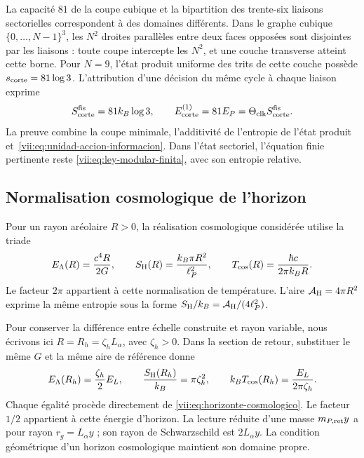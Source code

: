 La capacité \(81\) de la coupe cubique et la bipartition des trente-six liaisons sectorielles correspondent à des domaines différents. Dans le graphe cubique \(\{0,\ldots,N-1\}^3\), les \(N^2\) droites parallèles entre deux faces opposées sont disjointes par les liaisons : toute coupe intercepte les \(N^2\), et une couche transverse atteint cette borne. Pour \(N=9\), l'état produit uniforme des trits de cette couche possède \(s_{\rm corte}=81\log3\). L'attribution d'une décision du même cycle à chaque liaison exprime
\begin{equation}
 S_{\rm corte}^{\rm fis}=81k_B\log3,\qquad
 E_{\rm corte}^{(1)}=81E_P
                  =\Theta_{\rm clk}S_{\rm corte}^{\rm fis}.
 \label{vii:eq:corte-energia-informacion}
\end{equation}
La preuve combine la coupe minimale, l'additivité de l'entropie de l'état produit et~\eqref{vii:eq:unidad-accion-informacion}. Dans l'état sectoriel, l'équation finie pertinente reste \eqref{vii:eq:ley-modular-finita}, avec son entropie relative.

\subsection{Normalisation cosmologique de l'horizon}
\label{vii:subsec:balance-horizonte}

Pour un rayon aréolaire \(R>0\), la réalisation cosmologique considérée utilise la triade
\begin{equation}
 E_\Lambda(R)=\frac{c^4R}{2G},\qquad
 S_{\rm H}(R)=\frac{k_B\pi R^2}{\ell_P^2},\qquad
 T_{\rm cos}(R)=\frac{\hbar c}{2\pi k_BR}.
 \label{vii:eq:horizonte-cosmologico}
\end{equation}
Le facteur \(2\pi\) appartient à cette normalisation de température.
L'aire \(\mathcal A_{\rm H}=4\pi R^2\) exprime la même entropie
sous la forme \(S_{\rm H}/k_B=\mathcal A_{\rm H}/(4\ell_P^2)\).

Pour conserver la différence entre échelle construite et rayon variable, nous écrivons ici \(R=R_h=\zeta_hL_\alpha\), avec \(\zeta_h>0\). Dans la section de retour, substituer le même \(G\) et la même aire de référence donne
\[
 E_\Lambda(R_h)=\frac{\zeta_h}{2}E_L,\qquad
 \frac{S_{\rm H}(R_h)}{k_B}=\pi\zeta_h^2,\qquad
 k_BT_{\rm cos}(R_h)=\frac{E_L}{2\pi\zeta_h}.
\]
Chaque égalité procède directement de
\eqref{vii:eq:horizonte-cosmologico}. Le facteur \(1/2\) appartient
à cette énergie d'horizon. La lecture réduite d'une masse
\(m_{P,\rm ret}y\) a pour rayon \(r_g=L_\alpha y\) ; son rayon de
Schwarzschild est \(2L_\alpha y\). La condition géométrique d'un
horizon cosmologique maintient son domaine propre.

